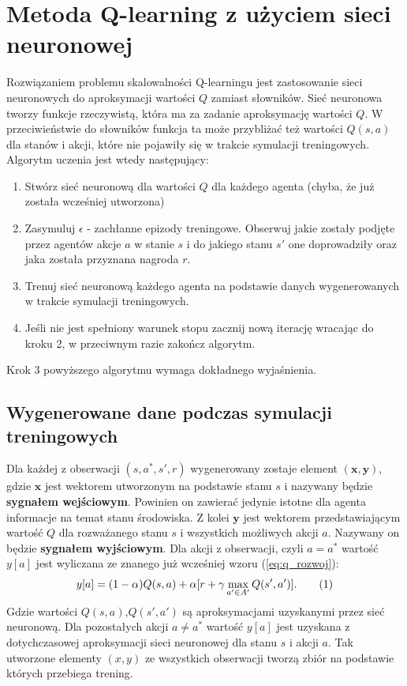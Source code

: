 \documentclass[12pt]{book}
\theoremstyle{plain}
\newcommand\addtag{\refstepcounter{equation}
\renewcommand{\labelenumii}{\theenumii}
\renewcommand{\theenumii}{\theenumi.\arabic{enumii}.}
\tag{\theequation}}
\newcommand{\myref}[1]{(\ref{#1})}
\begin{document}
\section{Metoda Q-learning z użyciem sieci neuronowej} \label{learning:DQN_single_agent}
Rozwiązaniem problemu skalowalności Q-learningu jest zastosowanie sieci neuronowych do aproksymacji wartości $Q$ zamiast słowników. Sieć neuronowa tworzy funkcje rzeczywistą, która ma za zadanie aproksymację wartości $Q$. W przeciwieństwie do słowników funkcja ta może przybliżać też wartości $Q(s,a)$ dla stanów i akcji, które nie pojawiły się w trakcie symulacji treningowych. Algorytm uczenia jest wtedy następujący:
\begin{enumerate}
	\item Stwórz sieć neuronową dla wartości $Q$ dla każdego agenta (chyba, że już została wcześniej utworzona)
	\item Zasymuluj $\epsilon$ - zachłanne epizody treningowe. Obserwuj jakie zostały podjęte przez agentów akcje $a$ w stanie $s$ i do jakiego stanu $s'$ one doprowadziły oraz jaka została przyznana nagroda $r$.
	\item Trenuj sieć neuronową każdego agenta na podstawie danych wygenerowanych w trakcie symulacji treningowych.
	\item Jeśli nie jest spełniony warunek stopu zacznij nową iterację wracając do kroku 2, w przeciwnym razie zakończ algorytm.
\end{enumerate}
Krok 3 powyższego algorytmu wymaga dokładnego wyjaśnienia.
\subsection{Wygenerowane dane podczas symulacji treningowych}
Dla każdej z obserwacji $(s,a^*,s',r)$ wygenerowany zostaje element $(\textbf{x},\textbf{y})$, gdzie $\textbf{x}$ jest wektorem utworzonym na podstawie stanu $s$ i nazywany będzie \textbf{sygnałem wejściowym}. Powinien on zawierać jedynie istotne dla agenta informacje na temat stanu środowiska. Z kolei $\textbf{y}$ jest wektorem przedstawiającym wartość $Q$ dla rozważanego stanu $s$ i wszystkich możliwych akcji $a$. Nazywany on będzie \textbf{sygnałem wyjściowym}. Dla akcji z obserwacji, czyli $a=a^*$ wartość $y[a]$ jest wyliczana ze znanego już wcześniej wzoru \myref{eq:q_rozwoj}:
\[ y[a]=(1-\alpha)Q(s,a) + \alpha [r + \gamma \max_{a' \in A'} Q(s',a')]. \addtag \]
Gdzie wartości $Q(s,a)$,$Q(s',a')$ są aproksymacjami uzyskanymi przez sieć neuronową. \newline \newline Dla pozostałych akcji $a \neq a^*$ wartość $y[a]$ jest uzyskana z dotychczasowej aproksymacji sieci neuronowej dla stanu $s$ i akcji $a$. Tak utworzone elementy $(x,y)$ ze wszystkich obserwacji tworzą zbiór na podstawie których przebiega trening.
\end{document}
